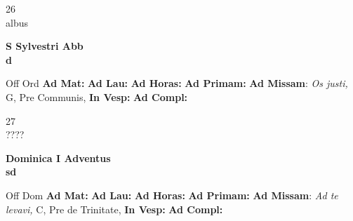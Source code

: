 \documentclass[10pt, openany]{book}
\begin{document}
    \begin{center}
        \begin{minipage}{3.5in}
            \vspace{2em}
            \begin{minipage}{0.5in}
                {\Huge 26} \\
                {\normalsize albus}
            \end{minipage}
            \begin{minipage}{3.0in}
                \textbf{ \large S Sylvestri Abb \\
                \textnormal{\normalsize d}}

            \end{minipage}
            \begin{justify}Off Ord
                \textbf{Ad Mat: }
                \textbf{Ad Lau: }
                \textbf{Ad Horas: }
                \textbf{Ad Primam: }\textbf{Ad Missam}: \textit{Os justi,} G, Pre Communis, 
                \textbf{In Vesp: }
                \textbf{Ad Compl: }
            \end{justify}
        \end{minipage}
    \end{center}

    \begin{center}
        \begin{minipage}{3.5in}
            \vspace{2em}
            \begin{minipage}{0.5in}
                {\Huge 27} \\
                {\normalsize ????}
            \end{minipage}
            \begin{minipage}{3.0in}
                \textbf{ \large Dominica I Adventus \\
                \textnormal{\normalsize sd}}

            \end{minipage}
            \begin{justify}Off Dom
                \textbf{Ad Mat: }
                \textbf{Ad Lau: }
                \textbf{Ad Horas: }
                \textbf{Ad Primam: }\textbf{Ad Missam}: \textit{Ad te levavi,} C, Pre de Trinitate, 
                \textbf{In Vesp: }
                \textbf{Ad Compl: }
            \end{justify}
        \end{minipage}
    \end{center}
\end{document}
